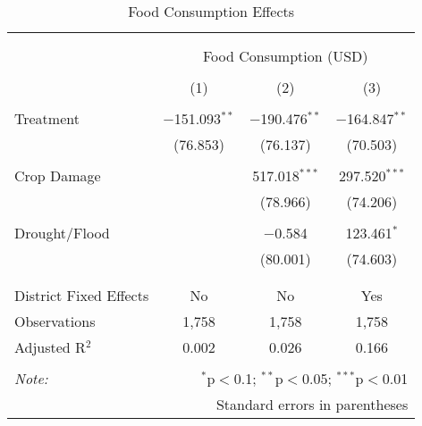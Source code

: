 
\begin{table}[!htbp] \centering 
  \caption{Food Consumption Effects} 
  \label{} 
\begin{tabular}{@{\extracolsep{5pt}}lccc} 
\\[-1.8ex]\hline 
\hline \\[-1.8ex] 
\\[-1.8ex] & \multicolumn{3}{c}{Food Consumption (USD)} \\ 
\\[-1.8ex] & (1) & (2) & (3)\\ 
\hline \\[-1.8ex] 
 Treatment & $-$151.093$^{**}$ & $-$190.476$^{**}$ & $-$164.847$^{**}$ \\ 
  & (76.853) & (76.137) & (70.503) \\ 
  & & & \\ 
 Crop Damage &  & 517.018$^{***}$ & 297.520$^{***}$ \\ 
  &  & (78.966) & (74.206) \\ 
  & & & \\ 
 Drought/Flood &  & $-$0.584 & 123.461$^{*}$ \\ 
  &  & (80.001) & (74.603) \\ 
  & & & \\ 
\hline \\[-1.8ex] 
District Fixed Effects & No & No & Yes \\ 
Observations & 1,758 & 1,758 & 1,758 \\ 
Adjusted R$^{2}$ & 0.002 & 0.026 & 0.166 \\ 
\hline 
\hline \\[-1.8ex] 
\textit{Note:}  & \multicolumn{3}{r}{$^{*}$p$<$0.1; $^{**}$p$<$0.05; $^{***}$p$<$0.01} \\ 
 & \multicolumn{3}{r}{Standard errors in parentheses} \\ 
\end{tabular} 
\end{table} 
